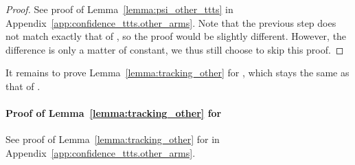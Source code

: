 \begin{proof}
    See proof of Lemma~\ref{lemma:psi_other_ttts} in Appendix~\ref{app:confidence_ttts.other_arms}. Note that the previous step does not match exactly that of \TTTS, so the proof would be slightly different. However, the difference is only a matter of constant, we thus still choose to skip this proof.
\end{proof}

It remains to prove Lemma~\ref{lemma:tracking_other} for \TCC, which stays the same as that of \TTTS.

\paragraph{Proof of Lemma~\ref{lemma:tracking_other} for \TCC} 

See proof of Lemma~\ref{lemma:tracking_other} for \TTTS in Appendix~\ref{app:confidence_ttts.other_arms}.

\hfill\BlackBox\\[2mm]


